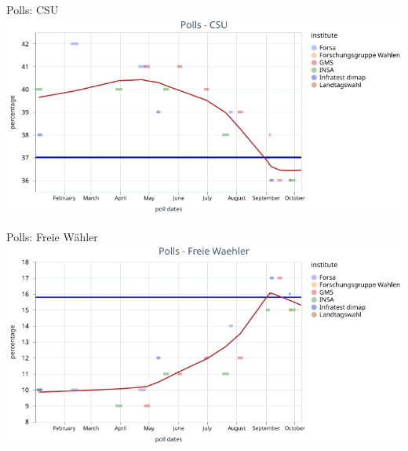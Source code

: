 
\begin{frame}{Polls: CSU}
	\includegraphics[width=\linewidth, keepaspectratio]{pictures/paper/polls/visualization_csu_polls.png}
\end{frame}

\begin{frame}{Polls: Freie Wähler}
	\includegraphics[width=\linewidth, keepaspectratio]{pictures/paper/polls/visualization_fw_polls.png}
\end{frame}